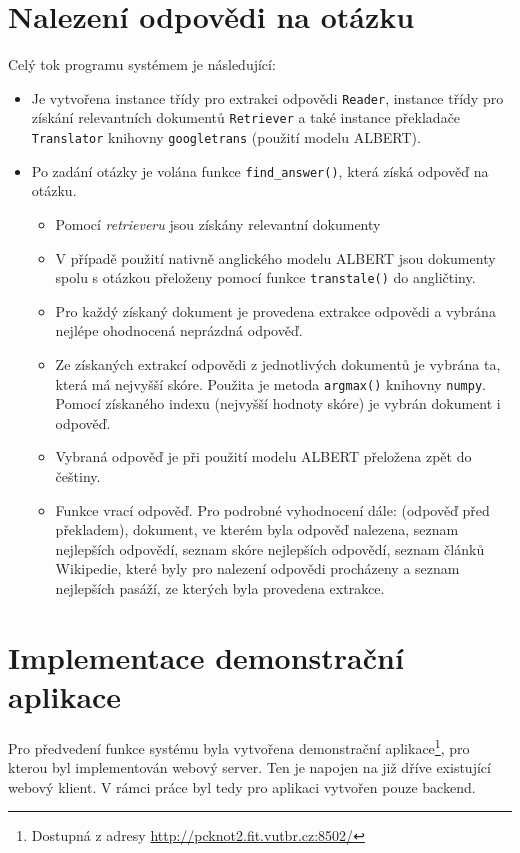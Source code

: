 \section*{Nalezení odpovědi na otázku}
Celý tok programu systémem je následující:
\begin{itemize}
    \item Je vytvořena instance třídy pro extrakci odpovědi \texttt{Reader}, instance třídy pro získání relevantních dokumentů \texttt{Retriever} a také instance překladače \texttt{Translator} knihovny \texttt{googletrans} (použití modelu ALBERT).
    
    \item Po zadání otázky je volána funkce \texttt{find\_answer()}, která získá odpověď na otázku.
    \begin{itemize}
        \item Pomocí \emph{retrieveru} jsou získány relevantní dokumenty
        \item V případě použití nativně anglického modelu ALBERT jsou dokumenty spolu s otázkou přeloženy pomocí funkce \texttt{transtale()} do angličtiny.
        \item Pro každý získaný dokument je provedena extrakce odpovědi a vybrána nejlépe ohodnocená neprázdná odpověď.
        \item Ze získaných extrakcí odpovědi z jednotlivých dokumentů je vybrána ta, která má nejvyšší skóre. Použita je metoda \texttt{argmax()} knihovny \texttt{numpy}. Pomocí získaného indexu (nejvyšší hodnoty skóre) je vybrán dokument i odpověď.
        \item Vybraná odpověď je při použití modelu ALBERT přeložena zpět do češtiny.
        \item Funkce vrací odpověď. Pro podrobné vyhodnocení dále: (odpověď před překladem), dokument, ve kterém byla odpověď nalezena, seznam nejlepších odpovědí, seznam skóre nejlepších odpovědí, seznam článků Wikipedie, které byly pro nalezení odpovědi procházeny a seznam nejlepších pasáží, ze kterých byla provedena extrakce.
    \end{itemize}
\end{itemize}

\section*{Implementace demonstrační aplikace}
Pro předvedení funkce systému byla vytvořena demonstrační aplikace\footnote{Dostupná z adresy \url{http://pcknot2.fit.vutbr.cz:8502/}}, pro kterou byl implementován webový server. Ten je napojen na již dříve existující webový klient. V rámci práce byl tedy pro aplikaci vytvořen pouze backend.

